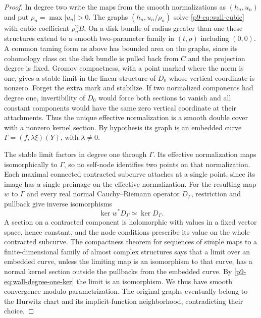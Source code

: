 \begin{proof}
In degree two write the maps from the smooth normalizations as
$(h_n,u_n)$ and put $\rho_n=\max |u_n|>0$. The graphs
$(h_n,u_n/\rho_n)$ solve \eqref{p9-eq:wall-cubic} with cubic coefficient
$\rho_n^2B$. On a disk bundle of radius greater than one these
structures extend to a smooth two-parameter family in $(t,\rho)$
including $(0,0)$. A common taming form as above has bounded area on
the graphs, since its cohomology class on the disk bundle is pulled
back from $C$ and the projection degree is fixed. Gromov compactness,
with a point marked where the norm is one, gives a stable limit in
the linear structure of $D_0$ whose vertical coordinate is nonzero.
Forget the extra mark and stabilize. If two normalized components
had degree one, invertibility of $D_0$ would force both sections to
vanish and all constant components would have the same zero vertical
coordinate at their attachments. Thus the unique effective
normalization is a smooth double cover with a nonzero kernel section.
By hypothesis its graph is an embedded curve $\Gamma=(f,\lambda\xi)(Y)$,
with $\lambda\ne0$.

The stable limit factors in degree one through $\Gamma$. Its effective
normalization maps isomorphically to $\Gamma$, so no self-node
identifies two points on that normalization. Each maximal connected
contracted subcurve attaches at a single point, since its image has a
single preimage on the effective normalization. For the resulting
map $w$ to $\Gamma$ and every real normal Cauchy--Riemann operator
$D_\Gamma$, restriction and pullback give inverse isomorphisms
\begin{equation}\label{p9-eq:wall-degree-one-ker}
                     \ker w^*D_\Gamma \simeq \ker D_\Gamma .
\end{equation}
A section on a contracted component is holomorphic with values in a
fixed vector space, hence constant, and the node conditions prescribe
its value on the whole contracted subcurve. The compactness theorem
for sequences of simple maps to a finite-dimensional family of almost
complex structures \cite[Theorem~3.1 and Remark~3.2(b)]{bai} says that
a limit over an embedded curve, unless the limiting map is an
isomorphism to that curve, has a normal kernel section outside the
pullbacks from the embedded curve. By \eqref{p9-eq:wall-degree-one-ker}
the limit is an isomorphism. We thus have smooth convergence modulo
parametrization. The original graphs eventually belong to the
Hurwitz chart and its implicit-function neighborhood, contradicting
their choice.


\end{proof}
